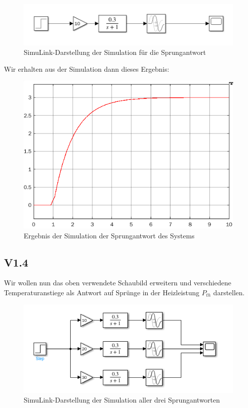 \documentclass{report}
\begin{document}
\begin{figure}[h]
  \centering
  \includegraphics[width=\textwidth]{../assets/images/RTP/rtp_1_V13_2.png}
  \caption{SimuLink-Darstellung der Simulation für die Sprungantwort}
  \label{fig:rtp1v13}
\end{figure}

Wir erhalten aus der Simulation dann dieses Ergebnis:

\begin{figure}[h]
  \centering
  \includegraphics[width=\textwidth]{../assets/images/RTP/rtp_1_V13.png}
  \caption{Ergebnis der Simulation der Sprungantwort des Systems}
  \label{fig:rtp1v13_2}
\end{figure}

\newpage

\subsection{V1.4}

Wir wollen nun das oben verwendete Schaubild erweitern und verschiedene Temperaturanstiege als Antwort auf Sprünge in der Heizleistung $P_{th}$ darstellen.

\begin{figure}[h]
  \centering
  \includegraphics[width=\textwidth]{../assets/images/RTP/rtp_1_V14_2.png}
  \caption{SimuLink-Darstellung der Simulation aller drei Sprungantworten}
  \label{fig:rtp1v14}
\end{figure}
\end{document}
